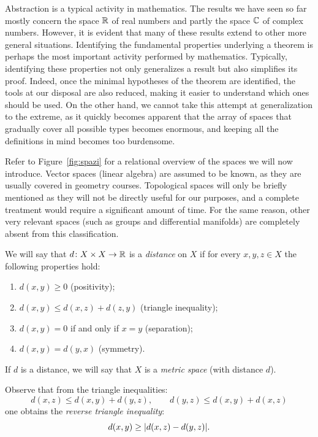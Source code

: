 Abstraction is a typical activity in mathematics. The results we have seen so
far mostly concern the space ${\mathbb R}$ of real numbers and partly the space ${\mathbb C}$ of
complex numbers. However, it is evident that many of these results extend to
other more general situations. Identifying the fundamental properties underlying
a theorem is perhaps the most important activity performed by mathematics.
Typically, identifying these properties not only generalizes a result but also
simplifies its proof. Indeed, once the minimal hypotheses of the theorem are
identified, the tools at our disposal are also reduced, making it easier to
understand which ones should be used. On the other hand, we cannot take this
attempt at generalization to the extreme, as it quickly becomes apparent that
the array of spaces that gradually cover all possible types becomes enormous,
and keeping all the definitions in mind becomes too burdensome.

Refer to Figure~\ref{fig:spazi} for a relational overview of the spaces we will
now introduce. Vector spaces (linear algebra) are assumed to be known, as they
are usually covered in geometry courses. Topological spaces will only be briefly
mentioned as they will not be directly useful for our purposes, and a complete
treatment would require a significant amount of time. For the same reason, other
very relevant spaces (such as groups and differential manifolds) are completely
absent from this classification.

\begin{definition}
\mymark{**}
\label{def:distanza}
We will say that $d\colon X\times X\to{\mathbb R}$ is a \emph{distance}%
%
 on $X$
if for every $x,y,z\in X$ the following properties hold:
\begin{enumerate}
\item
  $d(x,y)\ge 0$ (positivity);
\item
  $d(x,y)\le d(x,z) + d(z,y)$ (triangle inequality);
\item
  $d(x,y)=0$ if and only if $x=y$ (separation);
\item
  $d(x,y) = d(y,x)$ (symmetry).
\end{enumerate}

If $d$ is a distance, we will say that $X$ is a
\emph{metric space}
%
%
(with distance $d$).
\end{definition}

Observe that from the triangle inequalities:
\[
  d(x,z) \le d(x,y) + d(y,z), \qquad
  d(y,z) \le d(x,y) + d(x,z)
\]
one obtains the \emph{reverse triangle inequality}:
\[
  d(x,y) \ge {\left|d(x,z) - d(y,z)\right|}.
\]

